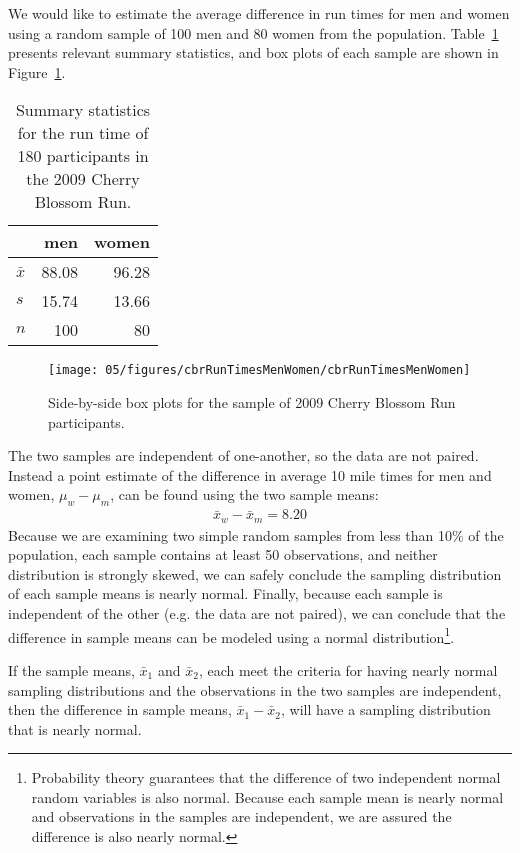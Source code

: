 We would like to estimate the average difference in run times for men and women using a random sample of 100 men and 80 women from the  population. Table~\ref{cherryBlossomRun2009SampleOf180SummaryStats} presents relevant summary statistics, and box plots of each sample are shown in Figure~\ref{cbrRunTimesMenWomen}.
\begin{table}[h]
\centering
\begin{tabular}{l rr}
\hline
	&	men	&	women \\
\hline
$\bar{x}$	& 88.08	& 96.28 \\
$s$	&	15.74	& 13.66 \\
$n$	&	100		& 80    \\
\hline
\end{tabular}
\caption{Summary statistics for the run time of 180 participants in the 2009 Cherry Blossom Run.}
\label{cherryBlossomRun2009SampleOf180SummaryStats}
\end{table}
\begin{figure}
\centering
\texttt{[image: 05/figures/cbrRunTimesMenWomen/cbrRunTimesMenWomen]}
\caption{Side-by-side box plots for the sample of 2009 Cherry Blossom Run participants.}
\label{cbrRunTimesMenWomen}
\end{figure}

The two samples are independent of one-another, so the data are not paired. Instead a point estimate of the difference in average 10 mile times for men and women, $\mu_w - \mu_m$, can be found using the two sample means:
\begin{eqnarray*}
\bar{x}_{w} - \bar{x}_{m} = 8.20
\end{eqnarray*}
Because we are examining two simple random samples from less than 10\% of the population, each sample contains at least 50 observations, and neither distribution is strongly skewed, we can safely conclude the sampling distribution of each sample means is nearly normal. Finally, because each sample is independent of the other (e.g. the data are not paired), we can conclude that the difference in sample means can be modeled using a normal distribution\footnote{Probability theory guarantees that the difference of two independent normal random variables is also normal. Because each sample mean is nearly normal and observations in the samples are independent, we are assured the difference is also nearly normal.}.

\begin{termBox}{
If the sample means, $\bar{x}_1$ and $\bar{x}_2$, each meet the criteria for having nearly normal sampling distributions and the observations in the two samples are independent, then the difference in sample means, $\bar{x}_1 - \bar{x}_2$, will have a sampling distribution that is nearly normal.}
\end{termBox}

